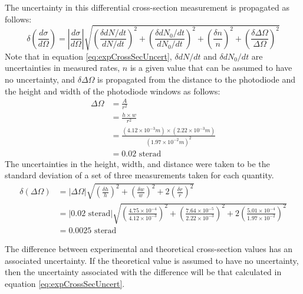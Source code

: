 \documentclass[a4paper]{article}
\begin{document}
The uncertainty in this differential cross-section measurement is propagated as follows:
\begin{equation} \label{eq:expCrossSecUncert}
 \delta \left( \frac{d \sigma}{d \Omega} \right)
   = \left\lvert \frac{d \sigma}{d \Omega} \right\rvert
   \sqrt
   {
        \left( \frac{\delta dN/dt}{dN/dt} \right) ^2
        +
        \left( \frac{\delta dN_0/dt}{dN_0/dt} \right) ^2
        +
        \left( \frac{\delta n}{n} \right) ^2
        +
        \left( \frac{\delta \Delta \Omega}{\Delta \Omega} \right) ^2
   }
\end{equation}
Note that in equation \ref{eq:expCrossSecUncert}, $\delta dN/dt$ and $\delta dN_0/dt$ are uncertainties in measured rates, $n$ is a given value that can be assumed to have no uncertainty, and $\delta \Delta \Omega$ is propagated from the distance to the photodiode and the height and width of the photodiode windows as follows:
\begin{align*}
\Delta \Omega &= \frac{A}{r^2} \\
              &= \frac{h \times w}{r^2} \\
              &= \frac{(4.12 \times 10^{-3}m) \times (2.22 \times 10^{-3}m)}{(1.97 \times 10^{-2} m)^2} \\
              &= 0.02 \text{ sterad}
\end{align*}
The uncertainties in the height, width, and distance were taken to be the standard deviation of a set of three measurements taken for each quantity.
\begin{align*}
 \delta \left( \Delta \Omega  \right)
   &= | \Delta \Omega |
   \sqrt{
        \left( \frac{\delta h}{h} \right) ^2
        +
         \left( \frac{\delta w}{w} \right) ^2
        + 2 \left( \frac{\delta r}{r} \right) ^2
   } \\
   &= | 0.02 \text{ sterad} |
   \sqrt{
        \left( \frac{4.75 \times 10^{-4}}{4.12 \times 10^{-3}} \right) ^2
        +
         \left( \frac{7.64 \times 10^{-5}}{2.22 \times 10^{-3}} \right) ^2
        + 2 \left( \frac{5.01 \times 10^{-4}}{1.97 \times 10^{-2}} \right) ^2
   } \\
   &= 0.0025 \text{ sterad}
\end{align*}

The difference between experimental and theoretical cross-section values has an associated uncertainty. If the theoretical value is assumed to have no uncertainty, then the uncertainty associated with the difference will be that calculated in equation \ref{eq:expCrossSecUncert}.
\end{document}
